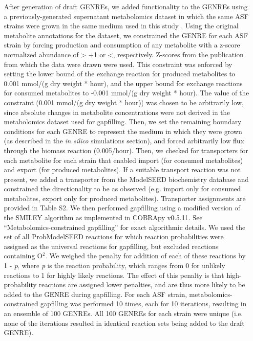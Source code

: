 \documentclass[11pt,twocolumn,notitlepage,openany,twoside]{book}
\begin{document}
\begin{refsection}
After generation of draft GENREs, we added functionality to the GENREs using a previously-generated supernatant metabolomics dataset in which the same ASF strains were grown in the same medium used in this study \cite{Biggs2017-fs}. Using the original metabolite annotations for the dataset, we constrained the GENRE for each ASF strain by forcing production and consumption of any metabolite with a z-score normalized abundance of \textgreater\! +1 or \textless{}, respectively. Z-scores from the publication from which the data were drawn were used. This constraint was enforced by setting the lower bound of the exchange reaction for produced metabolites to 0.001 mmol/(g dry weight * hour), and the upper bound for exchange reactions for consumed metabolites to -0.001 mmol/(g dry weight * hour). The value of the constraint (0.001 mmol/(g dry weight * hour)) was chosen to be arbitrarily low, since absolute changes in metabolite concentrations were not derived in the metabolomics dataset used for gapfilling. Then, we set the remaining boundary conditions for each GENRE to represent the medium in which they were grown (as described in the \textit{in silico} simulations section), and forced arbitrarily low flux through the biomass reaction (0.005/hour). Then, we checked for transporters for each metabolite for each strain that enabled import (for consumed metabolites) and export (for produced metabolites). If a suitable transport reaction was not present, we added a transporter from the ModelSEED biochemistry database and constrained the directionality to be as observed (e.g. import only for consumed metabolites, export only for produced metabolites). Transporter assignments are provided in Table S2. We then performed gapfilling using a modified version of the SMILEY algorithm \cite{Reed2006-qv} as implemented in COBRApy v0.5.11. See “Metabolomics-constrained gapfilling” for exact algorithmic details. We used the set of all ProbModelSEED reactions for which reaction probabilities were assigned as the universal reactions for gapfilling, but excluded reactions containing O$^2$. We weighed the penalty for addition of each of these reactions by 1 - \textit{p}, where \textit{p} is the reaction probability, which ranges from 0 for unlikely reactions to 1 for highly likely reactions. The effect of this penalty is that high-probability reactions are assigned lower penalties, and are thus more likely to be added to the GENRE during gapfilling. For each ASF strain, metabolomics-constrained gapfilling was performed 10 times, each for 10 iterations, resulting in an ensemble of 100 GENREs. All 100 GENREs for each strain were unique (i.e. none of the iterations resulted in identical reaction sets being added to the draft GENRE).


\end{refsection}
\end{document}
